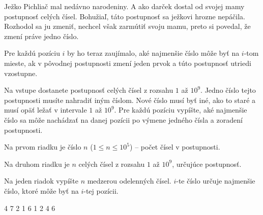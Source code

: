 




Ježko Pichliač mal nedávno narodeniny. A ako darček dostal od svojej mamy postupnosť celých čísel.
Bohužiaľ, táto postupnosť sa ježkovi hrozne nepáčila. Rozhodol sa ju zmeniť, nechcel však zarmútiť
svoju mamu, preto si povedal, že zmení práve jedno číslo.

Pre každú pozíciu $i$ by ho teraz zaujímalo, aké najmenšie číslo môže byť na $i$-tom mieste, ak v
pôvodnej postupnosti zmení jeden prvok a túto postupnosť utriedi vzostupne.


Na vstupe dostanete postupnosť celých čísel z rozsahu $1$ až $10^9$. Jedno číslo tejto postupnosti
musíte nahradiť iným číslom. Nové číslo musí byť iné, ako to staré a musí opäť ležať v intervale $1$
až $10^9$. Pre každú pozíciu vypíšte, aké najmenšie číslo sa môže nachádzať na danej pozícii po
výmene jedného čísla a zoradení postupnosti. 


Na prvom riadku je číslo $n$ ($1 \leq n \leq 10^5$) -- počet čísel v postupnosti.

Na druhom riadku je $n$ celých čísel z rozsahu $1$ až $10^9$, určujúce postupnosť.


Na jeden riadok vypíšte $n$ medzerou odelenných čísel. $i$-te číslo určuje najmenšie číslo, ktoré
môže byť na $i$-tej pozícii.


4 7 2 1 6
 1 2 4 6
\koniec


